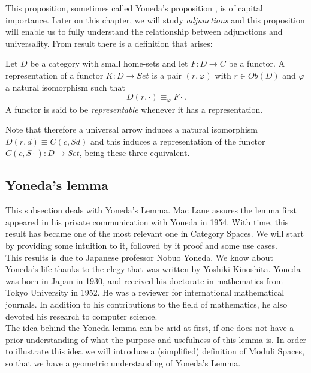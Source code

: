 This proposition, sometimes called Yoneda's proposition \cite[p. 81]{mac2013categories}, is of capital importance. Later on this chapter, we will study \emph{adjunctions} and this proposition will enable us to fully understand the relationship between adjunctions and universality. From result there is a definition that arises:

\begin{definition}
  Let $D$ be a category with small home-sets and let $F:D\to C$ be a functor. A representation of a functor $K:D\to Set$ is a pair $(r,\varphi)$ with $r \in Ob(D)$ and $ \varphi$ a natural isomorphism  such that
  $$D(r,\cdot) \equiv_{\varphi} F\cdot.$$
  A functor is said to be \emph{representable} whenever it has a representation.
\end{definition}

Note that therefore a universal arrow induces a natural isomorphism $D(r,d)\equiv C(c,Sd)$ and this induces a representation of the functor $C(c,S\cdot): D\to Set$, being these three equivalent.

\subsection{Yoneda's lemma}
This subsection  deals with Yoneda's Lemma. Mac Lane\cite{mac2013categories} assures the lemma first appeared in his private communication with Yoneda in 1954. With time, this result has became one of the most relevant one in Category Spaces. We will start by providing some intuition to it, followed by it proof and some use cases.\\


This results is due to Japanese professor Nobuo Yoneda. We know about Yoneda's life thanks to the elegy that was written by Yoshiki Kinoshita\cite{YonedaLife}. Yoneda was born in Japan in 1930, and received his doctorate in mathematics from Tokyo University in 1952. He was a reviewer for international mathematical journals. In addition to his contributions to the field of mathematics, he also devoted his research to computer science.\\


The idea behind the Yoneda lemma can be arid at first, if one does not have a prior understanding of what the purpose and usefulness of this lemma is. In order to illustrate this idea we will introduce a (simplified) definition of Moduli Spaces, so that we have a geometric understanding of Yoneda's Lemma.\\

